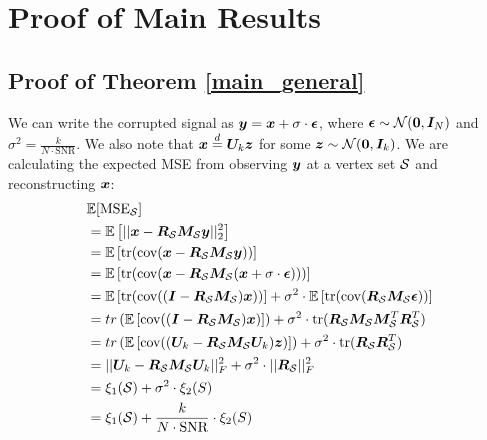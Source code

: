 \iffalse
\section{Proof of Main Results}
\label{proof_appendix}
\subsection{Proof of Theorem \ref{main_general}}
\label{proof_appendix_thm}
We can write the corrupted signal as $\bm{y} = \bm{x} + \sigma \cdot \bm{\epsilon}$, where $\bm{\epsilon} \sim \mathcal{N}(\bm{0}, \bm{I}_{N})$ and $\sigma^2 = \frac{k}{N \cdot \text{SNR}}$. We also note that $\bm{x} \overset{d}{=} \bm{U}_{k} \bm{z}$ for some $\bm{z} \sim \mathcal{N}(\bm{0}, \bm{I}_{k})$. We are calculating the expected MSE from observing $\bm{y}$ at a vertex set $\mathcal{S}$ and reconstructing $\bm{x}$:
\begin{align}
    &\mathbb{E}[\text{MSE}_{\mathcal{S}}] \\
    &= \mathbb{E}\left[ || \bm{x} - \bm{R}_{\mathcal{S}} \bm{M}_{\mathcal{S}} \bm{y} ||^{2}_{2} \right] \\
    &= \mathbb{E}\left[ \text{tr}(\text{cov}(\bm{x} - \bm{R}_{\mathcal{S}} \bm{M}_{\mathcal{S}} \bm{y})) \right] \\
        &= \mathbb{E}\left[ \text{tr}(\text{cov}(\bm{x} - \bm{R}_{\mathcal{S}} \bm{M}_{\mathcal{S}} (\bm{x} + \sigma \cdot \bm{\epsilon}))) \right] \\
    &= \mathbb{E}\left[ \text{tr}( \text{cov}( (\bm{I} - \bm{R}_{\mathcal{S}} \bm{M}_{\mathcal{S}}) \bm{x} ) ) \right] 
    + \sigma^{2} \cdot \mathbb{E}\left[ \text{tr}( \text{cov}( \bm{R}_{\mathcal{S}} \bm{M}_{\mathcal{S}} \bm{\epsilon} ) ) \right] \\
    &= tr\left( \mathbb{E} \left[ \text{cov}( (\bm{I} - \bm{R}_{\mathcal{S}} \bm{M}_{\mathcal{S}}) \bm{x} ) \right] \right)
    + \sigma^{2} \cdot \text{tr}(\bm{R}_{\mathcal{S}} \bm{M}_{\mathcal{S}} \bm{M}_{\mathcal{S}}^{T} \bm{R}_{\mathcal{S}}^{T}) \\
    &= tr\left( \mathbb{E} \left[ \text{cov}( (\bm{U}_{k} - \bm{R}_{\mathcal{S}} \bm{M}_{\mathcal{S}}\bm{U}_{k}) \bm{z} ) \right] \right)
    + \sigma^{2} \cdot \text{tr}(\bm{R}_{\mathcal{S}} \bm{R}_{\mathcal{S}}^{T}) \\
    &= || \bm{U}_{k} - \bm{R}_{\mathcal{S}}\bm{M}_{\mathcal{S}}\bm{U}_{k} ||^{2}_{F} + \sigma^2 \cdot || \bm{R}_{\mathcal{S}} ||^{2}_{F} \\ 
    &= \xi_{1}(\mathcal{S}) + \sigma^{2} \cdot \xi_{2}(S) \\
    &= \xi_{1}(\mathcal{S}) + \frac{k}{N \cdot \text{SNR}} \cdot \xi_{2}(S)
\end{align}


